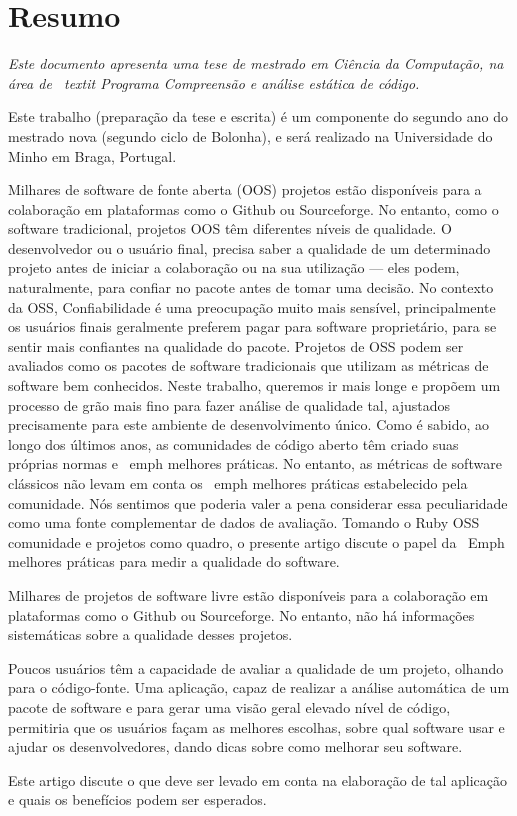\thispagestyle{plain}
\chapter*{Resumo}\label{chap:resumo}


{\it
Este documento apresenta uma tese de mestrado em Ciência da Computação, na área de \ textit {Programa Compreensão e análise estática de código}.

Este trabalho (preparação da tese e escrita) é um componente do segundo ano do mestrado nova (segundo ciclo de Bolonha), e será realizado na Universidade do Minho em Braga, Portugal.

 

  Milhares de software de fonte aberta (OOS) projetos estão disponíveis para a colaboração em plataformas como o Github ou Sourceforge.
  No entanto, como o software tradicional, projetos OOS têm diferentes níveis de qualidade.
  O desenvolvedor ou o usuário final, precisa saber a qualidade de um determinado projeto antes de iniciar a colaboração
  ou na sua utilização --- eles podem, naturalmente, para confiar no pacote antes de tomar uma decisão.
  No contexto da OSS, Confiabilidade é uma preocupação muito mais sensível, principalmente os usuários finais geralmente preferem pagar para
  software proprietário, para se sentir mais confiantes na qualidade do pacote.
  Projetos de OSS podem ser avaliados como os pacotes de software tradicionais que utilizam as métricas de software bem conhecidos.
  Neste trabalho, queremos ir mais longe e propõem um processo de grão mais fino para fazer análise de qualidade tal,
  ajustados precisamente para este ambiente de desenvolvimento único.
  Como é sabido, ao longo dos últimos anos, as comunidades de código aberto têm criado suas próprias normas e \ emph {} melhores práticas.
  No entanto, as métricas de software clássicos não levam em conta os \ emph {} melhores práticas
  estabelecido pela comunidade.
  Nós sentimos que poderia valer a pena considerar essa peculiaridade como uma fonte complementar de dados de avaliação.
  Tomando o Ruby OSS comunidade e projetos como quadro, o presente artigo discute o papel da
  \ Emph {} melhores práticas para medir a qualidade do software.

  Milhares de projetos de software livre estão disponíveis para a colaboração em plataformas como o Github ou Sourceforge.
  No entanto, não há informações sistemáticas sobre a qualidade desses projetos.
  
  Poucos usuários têm a capacidade de avaliar a qualidade de um projeto, olhando para o código-fonte.
  Uma aplicação, capaz de realizar a análise automática de um pacote de software e para gerar uma visão geral elevado nível de código,
  permitiria que os usuários façam as melhores escolhas, sobre qual software usar e ajudar os desenvolvedores,
  dando dicas sobre como melhorar seu software.
  
  Este artigo discute o que deve ser levado em conta na elaboração de tal aplicação e quais os benefícios podem ser esperados.

}

